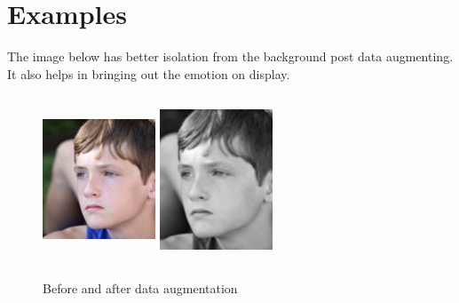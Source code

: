 \section{Examples}
\noindent The image below has better isolation from the background post data augmenting. It also helps in bringing out the emotion on display.
\begin{figure}[h!]
    \centering
  
    \includegraphics[width=0.3\textwidth, height=5cm]{resources/focus_colour.png} \hspace{3em}
    \includegraphics[width=0.3\textwidth, height=5cm]{resources/focus_bw.png}
  
    \caption{Before and after data augmentation}
  \end{figure}